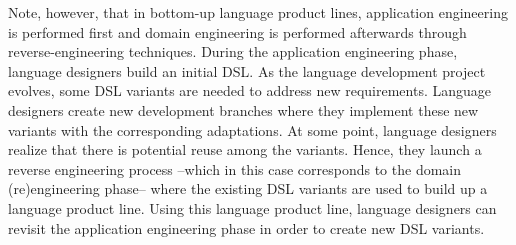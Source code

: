 Note, however, that in bottom-up language product lines, application engineering is performed first and domain engineering is performed afterwards through reverse-engineering techniques. During the application engineering phase, language designers build an initial DSL. As the language development project evolves, some DSL variants are needed to address new requirements. Language designers create new development branches where they implement these new variants with the corresponding adaptations. At some point, language designers realize that there is potential reuse among the variants. Hence, they launch a reverse engineering process --which in this case corresponds to the domain (re)engineering phase-- where the existing DSL variants are used to build up a language product line. Using this language product line, language designers can revisit the application engineering phase in order to create new DSL variants.




